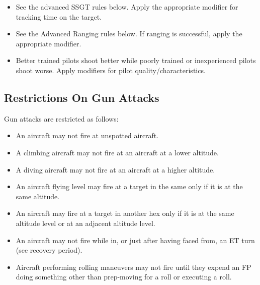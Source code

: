 \begin{itemize}
    \item{}
        See the advanced SSGT rules below. Apply the appropriate modifier for tracking time on the target.

    \item{}
        See the Advanced Ranging rules below. If ranging is successful, apply the appropriate modifier.

    \item{} Better trained pilots shoot better while poorly trained or inexperienced pilots shoot worse. Apply modifiers for pilot quality/characteristics.

\end{itemize}

\subsection{Restrictions On Gun Attacks} Gun attacks are restricted as follows:

\begin{itemize}
    \item An aircraft may not fire at unspotted aircraft.
    \item A climbing aircraft may not fire at an aircraft at a lower altitude.
    \item A diving aircraft may not fire at an aircraft at a higher altitude.
    \item An aircraft flying level may fire at a target in the same  only if it is at the same altitude.
    \item An aircraft may fire at a target in another hex only if it is at the same altitude level or at an adjacent altitude level.
    \item An aircraft may not fire while in, or just after having faced from, an ET turn (see recovery period).
    \item Aircraft performing rolling maneuvers may not fire until they expend an FP doing something other than prep-moving for a roll or executing a roll.
\end{itemize}



